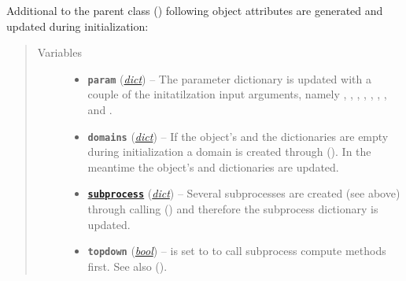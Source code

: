 \documentclass[a4paper,10pt,english]{sphinxmanual}
\begin{document}
\begin{fulllineitems}
Additional to the parent class {\hyperref[api/climlab.process:climlab.process.energy_budget.EnergyBudget]{\emph{}}} ()
following object attributes are generated and updated during initialization:
\begin{quote}\begin{description}
\item[{Variables}] \leavevmode\begin{itemize}
\item {} 
\textbf{\texttt{param}} (\href{http://docs.python.org/2.7/library/stdtypes.html\#dict}{\emph{dict}}) -- The parameter dictionary is updated with a couple 
of the initatilzation input arguments, namely
, , , , , 
, ,  and .

\item {} 
\textbf{\texttt{domains}} (\href{http://docs.python.org/2.7/library/stdtypes.html\#dict}{\emph{dict}}) -- If the object's  and the  
dictionaries are empty during initialization 
a domain  is created through 
{\hyperref[api/climlab.domain:climlab.domain.domain.zonal_mean_surface]{\emph{}}} ().
In the meantime the object's  and 
 dictionaries are updated.

\item {} 
\href{http://docs.python.org/2.7/library/subprocess.html\#module-subprocess}{\textbf{\texttt{subprocess}}} (\href{http://docs.python.org/2.7/library/stdtypes.html\#dict}{\emph{dict}}) -- Several subprocesses are created (see above) 
through calling 
{\hyperref[api/climlab.process:climlab.process.process.Process.add_subprocess]{\emph{}}} ()
and therefore the subprocess dictionary is updated.

\item {} 
\textbf{\texttt{topdown}} (\href{http://docs.python.org/2.7/library/functions.html\#bool}{\emph{bool}}) -- is set to  to call subprocess compute 
methods first.
See also 
{\hyperref[api/climlab.process:climlab.process.time_dependent_process.TimeDependentProcess]{\emph{}}} ().


\end{itemize}
\end{description}
\end{quote}
\end{fulllineitems}
\end{document}
